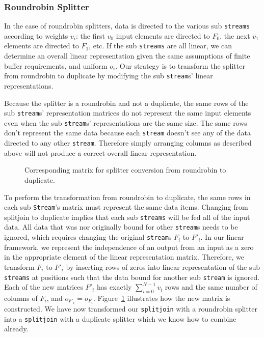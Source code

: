 \subsubsection{Roundrobin Splitter}

In the case of roundrobin splitters, data is directed to the various sub {\tt streams} 
according to weights $v_i$: the first $v_0$ input elements are directed to $F_0$, the next
$v_1$ elements are directed to $F_1$, etc. If the sub {\tt streams} are
all linear, we can determine an overall linear representation given the same
assumptions of finite buffer requirements, and uniform $o_i$.
Our strategy is to transform the splitter from roundrobin to duplicate by
modifying the sub {\tt stream}s' linear representations. 

Because the splitter is a roundrobin and not a duplicate, the same rows of the sub 
{\tt stream}s' representation matrices do not represent the same input elements 
even when the sub {\tt stream}s' representations are the same size. 
The same rows don't represent the same data because each {\tt stream} 
doesn't see any of the data directed to any other {\tt stream}. Therefore simply 
arranging columns as described above will not produce a correct overall linear representation. 

\begin{figure}
\center
\epsfxsize=3.0in
\caption{Corresponding matrix for splitter conversion from roundrobin to duplicate.}
\label{fig:splitjoin-roundrobin-matrix}
\end{figure}

To perform the transformation from roundrobin to duplicate, the same rows
in each sub {\tt Stream}'s matrix must represent the same data items. Changing from splitjoin to 
duplicate implies that each sub {\tt streams} will be fed all of the input data. All data
that was nor originally bound for other {\tt stream}s needs to be ignored, which requires
changing the original {\tt stream}s $F_i$ to $F'_i$. In our linear
framework, we represent the independence of an output from an input as a zero in the appropriate
element of the linear representation matrix. Therefore, we transform $F_i$ to $F'_i$ by inserting
rows of zeros into linear representation of the sub {\tt streams} at positions such that
the data bound for another sub {\tt stream} is ignored. Each of the new matrices $F'_i$ 
has exactly $\sum_{i=0}^{N-1}v_i$ rows and the same number of columns of $F_i$, and 
$o_{F'_i}=o_{F_i}$.
Figure~\ref{fig:splitjoin-roundrobin-matrix} illustrates how the new matrix is constructed.
We have now transformed our {\tt splitjoin} with a roundrobin splitter into a {\tt splitjoin}
with a duplicate splitter which we know how to combine already.

